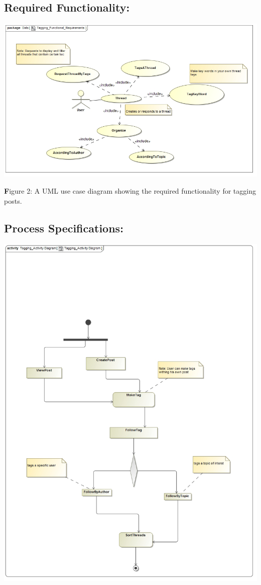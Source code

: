 \documentclass[a4paper,11pt]{article}
\begin{document}
\subsection{Required Functionality:} 
\begin{center}
\includegraphics[width=0.9\linewidth]{Images/SocialTagging/Tagging_Functional_Requirements}
\end{center}

\textbf Figure 2: A UML use case diagram showing the required functionality for tagging posts.

\subsection{Process Specifications:} 

\begin{center}
\includegraphics[width=0.9\linewidth]{Images/SocialTagging/Tagging_Activity_Diagram}
\end{center}
\end{document}
